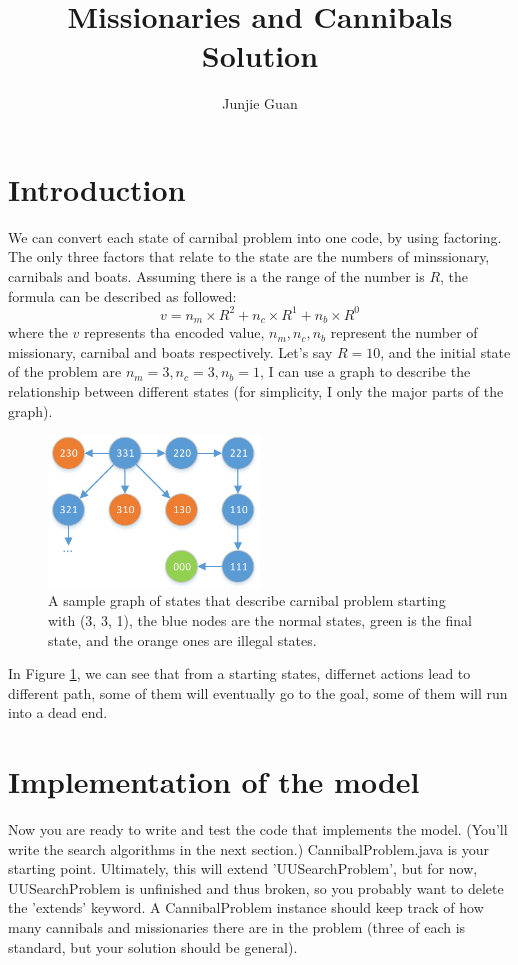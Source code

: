 \documentclass{article}
\title{Missionaries and Cannibals Solution}
\author{Junjie Guan}
\begin{document}
\maketitle

\section{Introduction}
We can convert each state of carnibal problem into one code, by using factoring. The only three factors that relate to the state are the numbers of minssionary, carnibals and boats. Assuming there is a the range of the number is $R$, the formula can be described as followed:
$$v = n_m \times R^2 + n_c \times R^1 + n_b \times R^0$$
where the $v$ represents tha encoded value, $n_m, n_c, n_b$ represent the number of missionary, carnibal and boats respectively. Let's say $R = 10$, and the initial state of the problem are $n_m = 3, n_c = 3, n_b = 1$, I can use a graph to describe the relationship between different states (for simplicity, I only the major parts of the graph).

\begin{figure}[!h]
\centering
\includegraphics[width=0.5\textwidth]{hw1.pdf}
\caption{A sample graph of states that describe carnibal problem starting with (3, 3, 1), the blue nodes are the normal states, green is the final state, and the orange ones are illegal states.}
\label{states}
\end{figure}

In Figure \ref{states}, we can see that from a starting states, differnet actions lead to different path, some of them will eventually go to the goal, some of them will run into a dead end.

\section{Implementation of the model}
Now you are ready to write and test the code that implements the model. (You'll write the search algorithms in the next section.) CannibalProblem.java is your starting point. Ultimately, this will extend 'UUSearchProblem', but for now, UUSearchProblem is unfinished and thus broken, so you probably want to delete the 'extends' keyword.
A CannibalProblem instance should keep track of how many cannibals and missionaries there are in the problem (three of each is standard, but your solution should be general).
\end{document}
